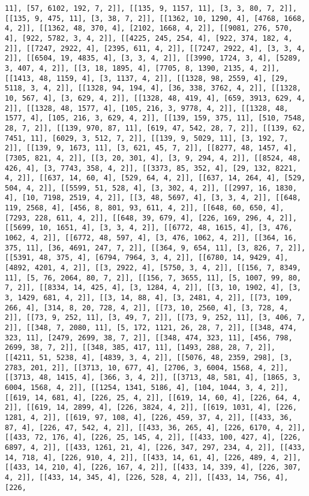 \documentclass[12pt,fleqn]{article}\usepackage{../../common}
\begin{document}
\begin{verbatim}
11], [57, 6102, 192, 7, 2]], [[135, 9, 1157, 11], [3, 3, 80, 7, 2]], [[135, 9, 475, 11], [3, 38, 7, 2]], [[1362, 10, 1290, 4], [4768, 1668, 4, 2]], [[1362, 48, 370, 4], [2102, 1668, 4, 2]], [[9081, 276, 570, 4], [922, 5782, 3, 4, 2]], [[4225, 245, 254, 4], [922, 374, 182, 4, 2]], [[7247, 2922, 4], [2395, 611, 4, 2]], [[7247, 2922, 4], [3, 3, 4, 2]], [[6504, 19, 4835, 4], [3, 3, 4, 2]], [[3990, 1724, 3, 4], [5289, 3, 407, 4, 2]], [[3, 18, 1895, 4], [7705, 8, 1390, 2135, 4, 2]], [[1413, 48, 1159, 4], [3, 1137, 4, 2]], [[1328, 98, 2559, 4], [29, 5118, 3, 4, 2]], [[1328, 94, 194, 4], [36, 338, 3762, 4, 2]], [[1328, 10, 567, 4], [3, 629, 4, 2]], [[1328, 48, 419, 4], [659, 3913, 629, 4, 2]], [[1328, 48, 1577, 4], [105, 216, 3, 9778, 4, 2]], [[1328, 48, 1577, 4], [105, 216, 3, 629, 4, 2]], [[139, 159, 375, 11], [510, 7548, 28, 7, 2]], [[139, 970, 87, 11], [619, 47, 542, 28, 7, 2]], [[139, 62, 7451, 11], [6029, 3, 512, 7, 2]], [[139, 9, 5029, 11], [3, 192, 7, 2]], [[139, 9, 1673, 11], [3, 621, 45, 7, 2]], [[8277, 48, 1457, 4], [7305, 821, 4, 2]], [[3, 20, 301, 4], [3, 9, 294, 4, 2]], [[8524, 48, 426, 4], [3, 7743, 358, 4, 2]], [[3373, 85, 352, 4], [29, 132, 8221, 4, 2]], [[637, 14, 60, 4], [529, 64, 4, 2]], [[637, 14, 264, 4], [529, 504, 4, 2]], [[5599, 51, 528, 4], [3, 302, 4, 2]], [[2997, 16, 1830, 4], [10, 7198, 2519, 4, 2]], [[3, 48, 5697, 4], [3, 3, 4, 2]], [[648, 119, 2568, 4], [456, 8, 801, 93, 611, 4, 2]], [[648, 60, 650, 4], [7293, 228, 611, 4, 2]], [[648, 39, 679, 4], [226, 169, 296, 4, 2]], [[5699, 10, 1651, 4], [3, 3, 4, 2]], [[6772, 48, 1615, 4], [3, 476, 1062, 4, 2]], [[6772, 48, 597, 4], [3, 476, 1062, 4, 2]], [[364, 16, 375, 11], [36, 4691, 247, 7, 2]], [[364, 9, 654, 11], [3, 826, 7, 2]], [[5391, 48, 375, 4], [6794, 7964, 3, 4, 2]], [[6780, 14, 9429, 4], [4892, 4201, 4, 2]], [[3, 2922, 4], [5750, 3, 4, 2]], [[156, 7, 8349, 11], [5, 76, 2064, 80, 7, 2]], [[156, 7, 3655, 11], [5, 1007, 99, 80, 7, 2]], [[8334, 14, 425, 4], [3, 1284, 4, 2]], [[3, 10, 1902, 4], [3, 3, 1429, 681, 4, 2]], [[3, 14, 88, 4], [3, 2481, 4, 2]], [[73, 109, 266, 4], [314, 8, 20, 728, 4, 2]], [[73, 10, 2560, 4], [3, 728, 4, 2]], [[73, 9, 252, 11], [3, 49, 7, 2]], [[73, 9, 252, 11], [3, 406, 7, 2]], [[348, 7, 2080, 11], [5, 172, 1121, 26, 28, 7, 2]], [[348, 474, 323, 11], [2479, 2699, 38, 7, 2]], [[348, 474, 323, 11], [456, 798, 2699, 38, 7, 2]], [[348, 385, 417, 11], [1493, 288, 28, 7, 2]], [[4211, 51, 5238, 4], [4839, 3, 4, 2]], [[5076, 48, 2359, 298], [3, 2783, 201, 2]], [[3713, 10, 677, 4], [2706, 3, 6004, 1568, 4, 2]], [[3713, 48, 1415, 4], [366, 3, 4, 2]], [[3713, 48, 581, 4], [1865, 3, 6004, 1568, 4, 2]], [[1254, 1341, 5186, 4], [104, 1044, 3, 4, 2]], [[619, 14, 681, 4], [226, 25, 4, 2]], [[619, 14, 60, 4], [226, 64, 4, 2]], [[619, 14, 2899, 4], [226, 3824, 4, 2]], [[619, 1031, 4], [226, 1281, 4, 2]], [[619, 97, 108, 4], [226, 459, 37, 4, 2]], [[433, 36, 87, 4], [226, 47, 542, 4, 2]], [[433, 36, 265, 4], [226, 6170, 4, 2]], [[433, 72, 176, 4], [226, 25, 145, 4, 2]], [[433, 100, 427, 4], [226, 6897, 4, 2]], [[433, 1261, 21, 4], [226, 347, 297, 234, 4, 2]], [[433, 14, 718, 4], [226, 910, 4, 2]], [[433, 14, 61, 4], [226, 489, 4, 2]], [[433, 14, 210, 4], [226, 167, 4, 2]], [[433, 14, 339, 4], [226, 307, 4, 2]], [[433, 14, 345, 4], [226, 528, 4, 2]], [[433, 14, 756, 4], [226, 
\end{verbatim}
\end{document}
